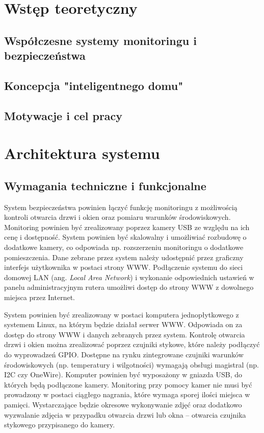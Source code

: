 \documentclass[a4paper,11pt,twoside]{article}
\begin{document}


\tableofcontents
\setcounter{tocdepth}{2}
\newpage

\section{Wstęp teoretyczny}

\subsection{Współczesne systemy monitoringu i bezpieczeństwa}

\subsection{Koncepcja "inteligentnego domu"}

\subsection{Motywacje i cel pracy}

\newpage
\section{Architektura systemu}

\subsection{Wymagania techniczne i funkcjonalne}
System bezpieczeństwa powinien łączyć funkcję monitoringu z możliwością kontroli otwarcia drzwi i okien oraz pomiaru warunków środowiskowych. Monitoring powinien być zrealizowany poprzez kamery USB ze względu na ich cenę i dostępność. System powinien być skalowalny i umożliwiać rozbudowę o dodatkowe kamery, co odpowiada np. rozszerzeniu monitoringu o dodatkowe pomieszczenia. Dane zebrane przez system należy udostępnić przez graficzny interfejs użytkownika w postaci strony WWW. Podłączenie systemu do sieci domowej LAN (ang. \textit{Local Area Network}) i wykonanie odpowiednich ustawień w panelu administracyjnym rutera umożliwi dostęp do strony WWW z dowolnego miejsca przez Internet.

System powinien być zrealizowany w postaci komputera jednopłytkowego z systemem Linux, na którym będzie działał serwer WWW. Odpowiada on za dostęp do strony WWW i danych zebranych przez system. Kontrolę otwarcia drzwi i okien można zrealizować poprzez czujniki stykowe, które należy podłączyć do wyprowadzeń GPIO. Dostępne na rynku zintegrowane czujniki warunków środowiskowych (np. temperatury i wilgotności) wymagają obsługi magistral (np. I2C czy OneWire). Komputer powinien być wyposażony w gniazda USB, do których będą podłączone kamery. Monitoring przy pomocy kamer nie musi być prowadzony w postaci ciągłego nagrania, które wymaga sporej ilości miejsca w pamięci. Wystarczające będzie okresowe wykonywanie zdjęć oraz dodatkowo wyzwalanie zdjęcia w przypadku otwarcia drzwi lub okna -- otwarcia czujnika stykowego przypisanego do kamery. 
\end{document}
